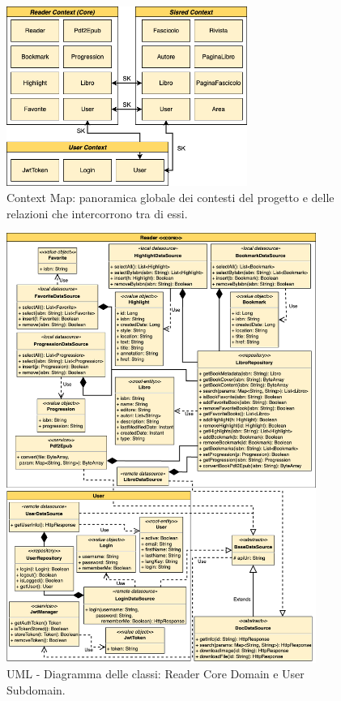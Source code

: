 \begin{figure}[H]
\centering
\includegraphics[width=0.7\textwidth]{img/tesi-20-app-domain.drawio.png}
\caption{Context Map: panoramica globale dei contesti del progetto e delle relazioni che intercorrono tra di essi.}
\end{figure}

\begin{figure}[H]
\centering
\includegraphics[width=0.9\textwidth]{img/tesi-25-ddd.drawio.png}
\caption{UML - Diagramma delle classi: Reader Core Domain e User Subdomain.}
\label{fig:5.4}
\end{figure}

